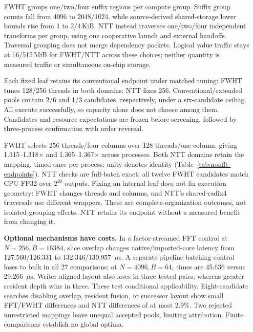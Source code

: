 FWHT groups one/two/four suffix regions per compute group. Suffix group
counts fall from 4096 to 2048/1024, while source-derived shared-storage
lower bounds rise from 1 to 2/4\,KiB. NTT instead traverses one/two/four
independent transforms per group, using one cooperative launch and external
handoffs. Traversal grouping does not merge dependency packets. Logical
value traffic stays at 16/512\,MiB for FWHT/NTT across these choices;
neither quantity is measured traffic or simultaneous on-chip storage.

Each fixed leaf retains its conventional endpoint under matched tuning:
FWHT tunes 128/256 threads in both domains; NTT fixes 256. Conventional/extended
pools contain 2/6 and 1/3 candidates, respectively, under a six-candidate ceiling.
All execute successfully, so capacity alone does not choose among them.
Candidates and resource expectations are frozen before screening, followed
by three-process confirmation with order reversal.

\begin{table}[t]
\centering\small
\caption{The common construction admits different measured choices.
Times and paired ratios are three-process medians; ``same'' reuses one mapping.}
\label{tab:nonfft-endpoints}

\end{table}

FWHT selects 256 threads/four columns over 128 threads/one column,
giving 1.315--1.318$\times$ and 1.365--1.367$\times$ across processes.
Both NTT domains retain the mapping, timed once per process; unity denotes identity (Table~\ref{tab:nonfft-endpoints}). NTT checks are
full-batch exact; all twelve FWHT candidates match CPU FP32 over $2^{20}$ outputs.
Fixing an internal leaf does not fix execution geometry: FWHT changes threads
and columns, and NTT's shared-radix4 traversals use different wrappers.
These are complete-organization outcomes, not isolated grouping effects.
NTT retains its endpoint without a measured benefit from changing it.

\textbf{Optional mechanisms have costs.}
\label{sec:component-ablation}
In a factor-streamed FFT control at $N=256,B=16384$, slice overlap changes
native/imported-core latency from 127.560/126.331 to 132.346/130.957~$\mu$s.
A separate pipeline-batching control loses to bulk in all 27 comparisons;
at $N=4096,B=64$, times are 45.636 versus 29.266~$\mu$s.
Writer-aligned layout also loses in three tested pairs, whereas greater
resident depth wins in three. These test conditional applicability.
Eight-candidate searches disabling overlap, resident fusion, or
successor layout show small FFT/FWHT differences and NTT differences of at most
2.9\%. Two rejected unrestricted mappings leave unequal accepted pools,
limiting attribution. Finite comparisons establish no global optima.
\label{sec:selection-evaluation}

